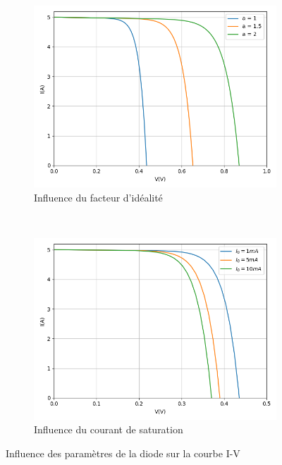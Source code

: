 \begin{figure}
  \begin{subfigure}[b]{0.48\textwidth}
    \begin{center}
      \includegraphics[width=\textwidth]{resources/ainf.png}
      \caption{Influence du facteur d'idéalité}
    \end{center}
  \end{subfigure}
  ~
  \begin{subfigure}[b]{0.48\textwidth}
    \begin{center}
      \includegraphics[width=\textwidth]{resources/i0inf.png}
      \caption{Influence du courant de saturation}
    \end{center}
  \end{subfigure}
  \caption{Influence des paramètres de la diode sur la courbe I-V}
  \label{fig:dinf}

\end{figure}
  
